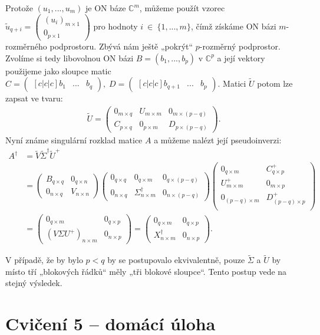 \documentclass[]{article}
\newcommand{\mat}[1]{\begin{pmatrix}#1\end{pmatrix}}
\newcommand{\x}{\times}
\begin{document}
Protože $(u_1, ..., u_m)$ je ON báze $\mathbb{C}^m$, můžeme použít vzorec $\widetilde{u}_{q+i} = \mat{
  (u_i)_{m \x 1} \\
  0_{p \x 1}
}$ pro hodnoty $i~\in~\{ 1, ..., m \}$, čímž získáme ON bázi $m$-rozměrného podprostoru. Zbývá nám ještě „pokrýt“ $p$-rozměrný podprostor. Zvolíme si tedy libovolnou ON bázi $B = (b_1, ..., b_p)$ v $\mathbb{C}^p$ a její vektory použijeme jako sloupce matic
$
  C =
  \begin{pmatrix}[c|c|c]
    b_1 & ... & b_q
  \end{pmatrix}, \;
  D =
  \begin{pmatrix}[c|c|c]
    b_{q+1} & ... & b_p
  \end{pmatrix}
$.
Matici $\widetilde{U}$ potom lze zapsat ve tvaru:
\begin{align*}
  \widetilde{U} =
  \mat{
    0_{m \x q} & U_{m \x m} & 0_{m \x (p-q)} \\
    C_{p \x q} & 0_{p \x m} & D_{p \x (p-q)}
  }.
\end{align*}
Nyní známe singulární rozklad matice $A$ a můžeme nalézt její pseudoinverzi:
\begin{align*}
  A^\dagger
  &= \widetilde{V} \widetilde{\Sigma}^\dagger \widetilde{U}^+ \\
  &= \mat{
    B_{q \x q} & 0_{q \x n} \\
    0_{n \x q} & V_{n \x n}
  }
  \mat{
    0_{q \x q} & 0_{q \x m} & 0_{q \x (p-q)} \\
    0_{n \x q} & \Sigma^\dagger_{n \x m} & 0_{n \x (p-q)}
  }
  \mat{
    0_{q \x m} &    C^+_{q \x p} \\
    U^+_{m \x m} &    0_{m \x p} \\
    0_{(p-q) \x m} &    D^+_{(p-q) \x p} \\
  } \\
  &= \mat{
    0_{q \x m} & 0_{q \x p} \\
    (V \Sigma U^+)_{n \x m} & 0_{n \x p}
  }
  = \mat{
    0_{q \x m} & 0_{q \x p} \\
    X^\dagger_{n \x m} & 0_{n \x p}
  }.
\end{align*}

V případě, že by bylo $p<q$ by se postupovalo ekvivalentně, pouze $\widetilde{\Sigma}$ a $\widetilde{U}$ by místo tří „blokových řádků“ měly „tři blokové sloupce“. Tento postup vede na stejný výsledek.

\bigskip
\bigskip
\pagebreak

\section{Cvičení 5 – domácí úloha}
\end{document}
